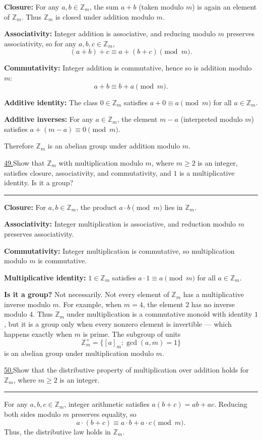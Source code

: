\documentclass[12pt]{article}
\begin{document}
\textbf{Closure:} For any $a, b \in \mathbb{Z}_m$, the sum $a + b$ (taken modulo $m$) is again an element of $\mathbb{Z}_m$. Thus $\mathbb{Z}_m$ is closed under addition modulo $m$.

\textbf{Associativity:} Integer addition is associative, and reducing modulo $m$ preserves associativity, so for any $a,b,c\in\mathbb{Z}_m$,
\[
(a+b)+c \equiv a+(b+c) \pmod{m}.
\]

\textbf{Commutativity:} Integer addition is commutative, hence so is addition modulo $m$:
\[
a+b \equiv b+a \pmod{m}.
\]

\textbf{Additive identity:} The class $0\in\mathbb{Z}_m$ satisfies $a+0\equiv a\pmod m$ for all $a\in\mathbb{Z}_m$.

\textbf{Additive inverses:} For any $a\in\mathbb{Z}_m$, the element $m-a$ (interpreted modulo $m$) satisfies $a+(m-a)\equiv 0\pmod m$.

Therefore $\mathbb{Z}_m$ is an abelian group under addition modulo $m$.

\newpage
\noindent\underline{49.}Show that $\mathbb{Z}_m$ with multiplication modulo $m$, where $m \geq 2$ is an integer, satisfies closure, associativity, and commutativity, and $1$ is a multiplicative identity. Is it a group?
\\\rule{\linewidth}{0.5pt}
\textbf{Closure:} For $a,b\in\mathbb{Z}_m$, the product $a\cdot b \pmod m$ lies in $\mathbb{Z}_m$.

\textbf{Associativity:} Integer multiplication is associative, and reduction modulo $m$ preserves associativity.

\textbf{Commutativity:} Integer multiplication is commutative, so multiplication modulo $m$ is commutative.

\textbf{Multiplicative identity:} $1\in\mathbb{Z}_m$ satisfies $a\cdot 1 \equiv a \pmod m$ for all $a\in\mathbb{Z}_m$.

\textbf{Is it a group?} Not necessarily. Not every element of $\mathbb{Z}_m$ has a multiplicative inverse modulo $m$. For example, when $m=4$, the element $2$ has no inverse modulo $4$. Thus $\mathbb{Z}_m$ under multiplication is a commutative monoid with identity $1$, but it is a group only when every nonzero element is invertible — which happens exactly when $m$ is prime. The subgroup of units
\[
\mathbb{Z}_m^\times = \{[a]_m : \gcd(a,m)=1\}
\]
is an abelian group under multiplication modulo $m$.

\newpage

\noindent\underline{50.}Show that the distributive property of multiplication over addition holds for $\mathbb{Z}_m$, where $m \geq 2$ is an integer.
\\\rule{\linewidth}{0.5pt}

For any $a, b, c \in \mathbb{Z}_m$, integer arithmetic satisfies $a(b+c) = ab + ac$. Reducing both sides modulo $m$ preserves equality, so
\[
a\cdot (b + c) \equiv a\cdot b + a\cdot c \pmod{m}.
\]
Thus, the distributive law holds in $\mathbb{Z}_m$.
\end{document}
